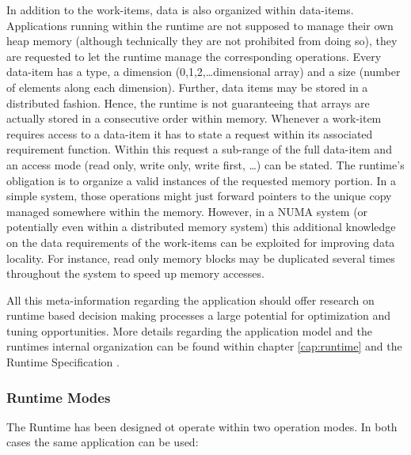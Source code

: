 In addition to the work-items, data is also organized within data-items.
 Applications running within the
runtime are not supposed to manage their own heap memory (although technically
they are not prohibited from doing so), they are requested to let the runtime
manage the corresponding operations. Every data-item has a type, a dimension
(0,1,2,\ldots dimensional array) and a size (number of elements along each
dimension). Further, data items may be stored in a distributed fashion. Hence,
the runtime is not guaranteeing that arrays are actually stored in a consecutive
order within memory. Whenever a work-item requires access to a data-item it has
to state a request within its associated requirement function. Within this
request a sub-range of the full data-item and an access mode (read only, write
only, write first, \ldots) can be stated. The runtime's obligation is to
organize a valid instances of the requested memory portion. In a simple system,
those operations might just forward pointers to the unique copy managed
somewhere within the memory. However, in a NUMA system (or potentially even
within a distributed memory system) this additional knowledge on the data
requirements of the work-items can be exploited for improving data locality. For
instance, read only memory blocks may be duplicated several times throughout
the system to speed up memory accesses. 

All this meta-information regarding the application should offer research
on runtime based decision making processes a large potential for optimization
and tuning opportunities. More details regarding the application model and the
runtimes internal organization can be found within chapter \ref{cap:runtime} and
the Runtime Specification \cite{insieme_runtime_spec}.

\subsubsection{Runtime Modes}
The Runtime has been designed ot operate within two operation modes. In both
cases the same application can be used:

